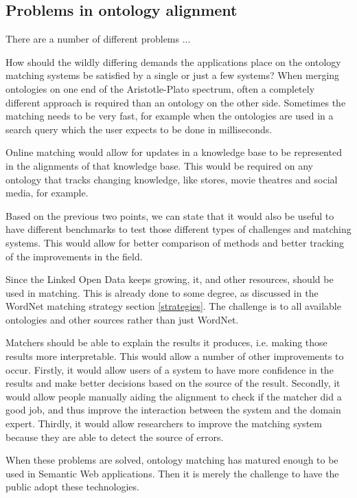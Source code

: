\documentclass{article}
\begin{document}
 \subsection{Problems in ontology alignment}
 There are a number of different problems ... %
 
 How should the wildly differing demands the applications place on the ontology matching systems be satisfied by a single or just a few systems? When merging ontologies on one end of the Aristotle-Plato spectrum, often a completely different approach is required than an ontology on the other side. Sometimes the matching needs to be very fast, for example when the ontologies are used in a search query which the user expects to be done in milliseconds.
 
 Online matching would allow for updates in a knowledge base to be represented in the alignments of that knowledge base. This would be required on any ontology that tracks changing knowledge, like stores, movie theatres and social media, for example.
 
 Based on the previous two points, we can state that it would also be useful to have different benchmarks to test those different types of challenges and matching systems. This would allow for better comparison of methods and better tracking of the improvements in the field.
 
 Since the Linked Open Data keeps growing, it, and other resources, should be used in matching. This is already done to some degree, as discussed in the WordNet matching strategy section \ref{strategies}. The challenge is to all available ontologies and other sources rather than just WordNet.
 
 Matchers should be able to explain the results it produces, i.e. making those results more interpretable. This would allow a number of other improvements to occur. Firstly, it would allow users of a system to have more confidence in the results and make better decisions based on the source of the result. Secondly, it would allow people manually aiding the alignment to check if the matcher did a good job, and thus improve the interaction between the system and the domain expert. Thirdly, it would allow researchers to improve the matching system because they are able to detect the source of errors.
 
 When these problems are solved, ontology matching has matured enough to be used in Semantic Web applications. Then it is merely the challenge to have the public adopt these technologies.
 
\end{document}
